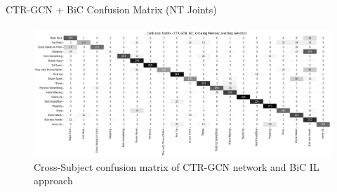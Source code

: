 \documentclass[aspectratio=169, xcolor=dvipsnames]{beamer}
\begin{document}
\begin{frame}{CTR-GCN + BiC Confusion Matrix (NT Joints)}
      \framesubtitle{}%
      
      \begin{figure}[ht!]
            \centering
            \includegraphics[width=\textwidth]{images/cf_ctr_bic_nt.png}
            \caption{Cross-Subject confusion matrix of CTR-GCN network and BiC IL approach}
      \end{figure}
\end{frame}
\end{document}
